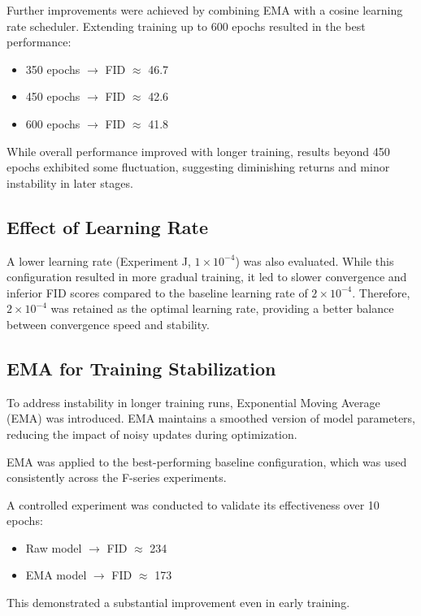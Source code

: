 \documentclass[conference]{IEEEtran}
\begin{document}
Further improvements were achieved by combining EMA with a cosine learning rate scheduler. Extending training up to 600 epochs resulted in the best performance:
\begin{itemize}
    \item 350 epochs $\rightarrow$ FID $\approx$ 46.7
    \item 450 epochs $\rightarrow$ FID $\approx$ 42.6
    \item 600 epochs $\rightarrow$ FID $\approx$ 41.8
\end{itemize}

While overall performance improved with longer training, results beyond 450 epochs exhibited some fluctuation, suggesting diminishing returns and minor instability in later stages.


\subsection{Effect of Learning Rate}

A lower learning rate (Experiment J, $1\times10^{-4}$) was also evaluated. While this configuration resulted in more gradual training, it led to slower convergence and inferior FID scores compared to the baseline learning rate of $2\times10^{-4}$. Therefore, $2\times10^{-4}$ was retained as the optimal learning rate, providing a better balance between convergence speed and stability.

\subsection{EMA for Training Stabilization}

To address instability in longer training runs, Exponential Moving Average (EMA) was introduced. EMA maintains a smoothed version of model parameters, reducing the impact of noisy updates during optimization.

EMA was applied to the best-performing baseline configuration, which was used consistently across the F-series experiments.

A controlled experiment was conducted to validate its effectiveness over 10 epochs:
\begin{itemize}
    \item Raw model $\rightarrow$ FID $\approx$ 234
    \item EMA model $\rightarrow$ FID $\approx$ 173
\end{itemize}

This demonstrated a substantial improvement even in early training.
\end{document}

